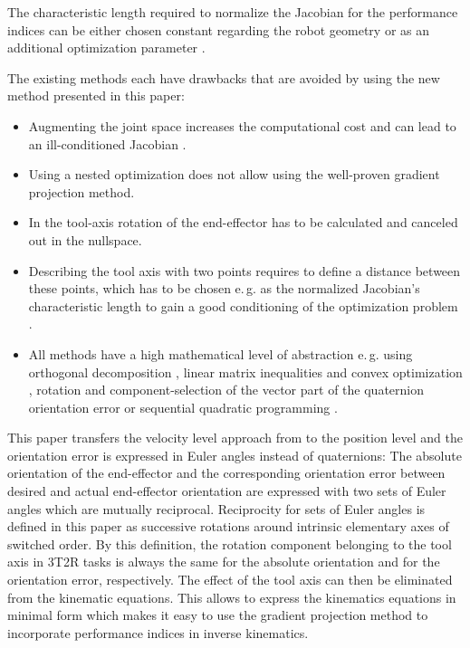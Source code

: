 \documentclass{svproc}
\begin{document}
The characteristic length required to normalize the Jacobian for the performance indices can be either chosen constant regarding the robot geometry \cite{ZhuQuCaoYan2013} or as an additional optimization parameter \cite{LegerAng2016}.

The existing methods each have drawbacks that are avoided by using the new method presented in this paper:
\begin{itemize}
    \item Augmenting the joint space \cite{Baron2000} increases the computational cost and can lead to an ill-conditioned Jacobian \cite{HuoBar2008}.
    \item Using a nested optimization \cite{ZhuQuCaoYan2013,GuoDonKe2015} does not allow using the well-proven gradient projection method.
    \item In \cite{Zlajpah2017} the tool-axis rotation of the end-effector has to be calculated and canceled out in the nullspace.
    \item Describing the tool axis with two points requires to define a distance between these points, which has to be chosen e.\,g. as the normalized Jacobian's characteristic length to gain a good conditioning of the optimization problem \cite{LegerAng2016}.
    \item All methods have a high mathematical level of abstraction e.\,g. using orthogonal decomposition \cite{HuoBar2008}, linear matrix inequalities and convex optimization \cite{FromGra2010}, rotation and component-selection of the vector part of the quaternion orientation error \cite{Zlajpah2017} or sequential quadratic programming \cite{LegerAng2016}.
\end{itemize}

This paper transfers the velocity level approach from \cite{Zlajpah2017} to the position level and the orientation error is expressed in Euler angles instead of quaternions:
%
The absolute orientation of the end-effector and the corresponding orientation error between desired and actual end-effector orientation are expressed with two sets of Euler angles which are mutually reciprocal.
Reciprocity for sets of Euler angles is defined in this paper as successive rotations around intrinsic elementary axes of switched order.
By this definition, the rotation component belonging to the tool axis in 3T2R tasks is always the same for the absolute orientation and for the orientation error, respectively.
The effect of the tool axis can then be eliminated from the kinematic equations.
This allows to express the kinematics equations in minimal form which makes it easy to use the gradient projection method to incorporate performance indices in inverse kinematics.
\end{document}
